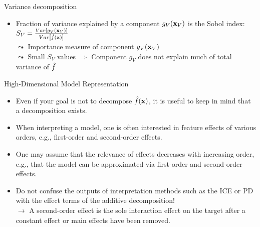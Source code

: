 \documentclass[10pt,compress,t,notes=noshow, xcolor=table]{beamer}
\newcommand{\open}{}
\newcommand{\close}{}
\begin{document}
\begin{frame}{Variance decomposition}
\begin{itemize}[<+->]
\item Fraction of variance explained by a component $g_{\open V \close}(\xv_V)$ is the Sobol index:
$
S_V = \frac{Var\left[g_{\open V \close}(\xv_V)\right]}{Var\left[\hat{f}(\xv)\right]}
$\\
$\leadsto$ Importance measure of component $g_{\open V \close}(\xv_V)$\\
$\leadsto$ Small $S_V$ values $\Rightarrow$ Component $g_{\open V \close}$ does not explain much of total variance of $\hat{f}$
\end{itemize}

\end{frame}


\begin{frame}{High-Dimensional Model Representation}

\begin{itemize}
\itemsep1em
    \item Even if your goal is not to decompose $\hat{f}(\mathbf{x})$, it is useful to keep in mind that a decomposition exists.
    \item When interpreting a model, one is often interested in feature effects of various orders, e.g., first-order and second-order effects.
    \item One may assume that the relevance of effects decreases with increasing order, e.g., that the model can be approximated via first-order and second-order effects.
    \item Do not confuse the outputs of interpretation methods such as the ICE or PD with the effect terms of the additive decomposition!
    \\$\rightarrow$ A second-order effect is the sole interaction effect on the target after a constant effect or main effects have been removed.
\end{itemize}
\end{frame}


\endlecture
\end{document}
